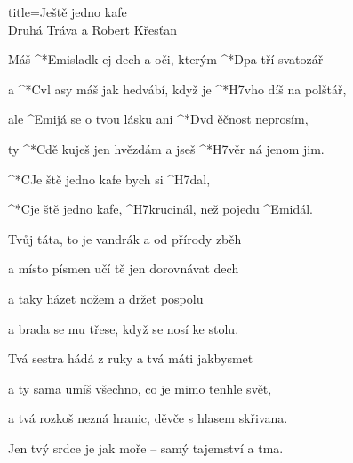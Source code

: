 \begin{song}{title=\predtitle\centering Ještě jedno kafe  \\\large Druhá Tráva a Robert Křesťan  \vspace*{-0.3cm}}  %
\begin{centerjustified}
\nejnejvetsi

\sloka 
	Máš ^*{Emi}sladk ej dech a oči, kterým ^*{D}pa tří svatozář

	a ^*{C}vl asy máš jak hedvábí, když je ^*{H7}vho díš na polštář,

	ale ^{Emi}já se o tvou lásku ani ^*{D}vd ěčnost neprosím,

	ty ^*{C}dě kuješ jen hvězdám a jseš ^*{H7}věr ná jenom jim.

	^*{C}Je ště jedno kafe bych si ^{H7}dal,

	^*{C}je ště jedno kafe, ^{\z H7}krucinál, než pojedu ^{Emi}dál.

\sloka
	Tvůj táta, to je vandrák a od přírody zběh
	
	a místo písmen učí tě jen dorovnávat dech
	
	a taky házet nožem a držet pospolu
   
	a brada se mu třese, když se nosí ke stolu.



\sloka
	Tvá sestra hádá z ruky a tvá máti jakbysmet
	
	a ty sama umíš všechno, co je mimo tenhle svět,
	
	a tvá rozkoš nezná hranic, děvče s hlasem skřivana.
	
	Jen tvý srdce je jak moře -- samý tajemství a tma.


\centering
{}

\end{centerjustified}
\setcounter{Slokočet}{0}
\end{song}
